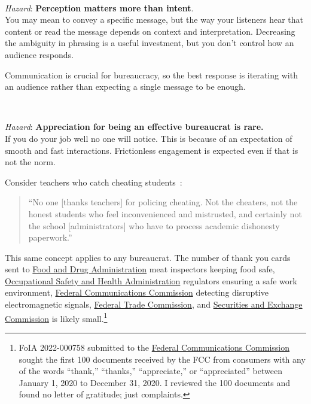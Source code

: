 \ \\
\begin{samepage}
\textit{Hazard}: \textbf{Perception matters more than intent}. \\
You may mean to convey a specific message, but the way your listeners hear that content or read the message depends on context and interpretation. 
Decreasing the ambiguity in phrasing is a useful investment, but you don't control how an audience responds. 

Communication is crucial for bureaucracy, so the best response is iterating with an audience rather than expecting a single message to be enough. 
\end{samepage}

\ \\
\begin{samepage}
\textit{Hazard}: \textbf{Appreciation for being an effective bureaucrat is rare.}\\
If you do your job well no one will notice. This is because of an expectation of smooth and fast interactions. Frictionless engagement is expected even if that is not the norm. 

Consider teachers who catch cheating students~\cite{2022_unknown}:
\begin{quote}
``No one [thanks teachers] for policing cheating. Not the cheaters, not the honest students who feel inconvenienced and mistrusted, and certainly not the school [administrators] who have to process academic dishonesty paperwork.''
\end{quote}
\end{samepage}

This same concept applies to any bureaucrat. The number of thank you cards sent to \href{https://www.fda.gov/}{Food and Drug Administration} meat inspectors keeping food safe, \href{https://www.osha.gov/}{Occupational Safety and Health Administration} regulators ensuring a safe work environment, \href{https://www.fcc.gov/}{Federal Communications Commission} detecting disruptive electromagnetic signals, \href{https://www.ftc.gov/}{Federal Trade Commission}, and \href{https://www.sec.gov/}{Securities and Exchange Commission} is likely small.\footnote{FoIA 2022-000758 submitted to the \href{https://www.fcc.gov/}{Federal Communications Commission}  
sought the first 100 documents received by the FCC from consumers with any of the words ``thank,'' ``thanks,'' ``appreciate,'' or ``appreciated'' between January 1, 2020 to December 31, 2020. 
I reviewed the 100 documents and found no letter of gratitude; just complaints.}

